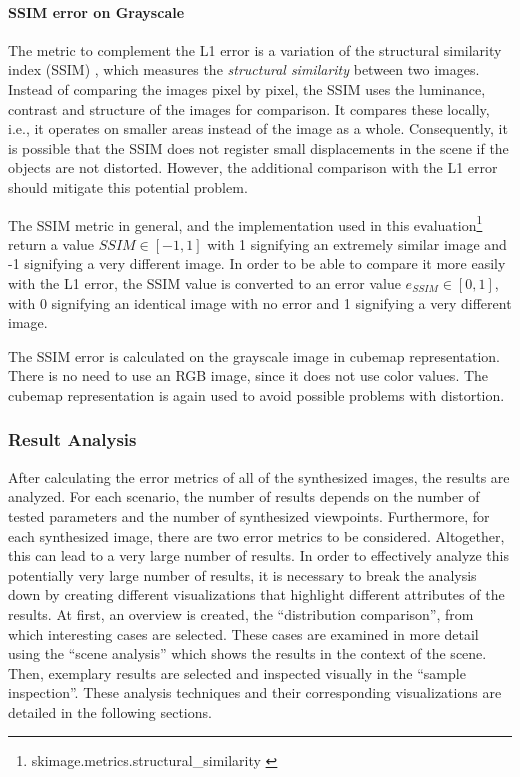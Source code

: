 \paragraph{SSIM error on Grayscale}
The metric to complement the L1 error is a variation of the structural similarity index (SSIM) \cite{ssim}, which measures the \emph{structural similarity} between two images. Instead of comparing the images pixel by pixel, the SSIM uses the luminance, contrast and structure of the images for comparison. It compares these locally, i.e., it operates on smaller areas instead of the image as a whole. Consequently, it is possible that the SSIM does not register small displacements in the scene if the objects are not distorted. However, the additional comparison with the L1 error should mitigate this potential problem.

The SSIM metric in general, and the implementation used in this evaluation\footnote{skimage.metrics.structural\_similarity \cite{skimage}} return a value $SSIM \in [-1, 1]$ with 1 signifying an extremely similar image and -1 signifying a very different image. In order to be able to compare it more easily with the L1 error, the SSIM value is converted to an error value $ e_{SSIM} \in [0,1]$, with 0 signifying an identical image with no error and 1 signifying a very different image.

The SSIM error is calculated on the grayscale image in cubemap representation. There is no need to use an RGB image, since it does not use color values. The cubemap representation is again used to avoid possible problems with distortion.

\subsubsection{Result Analysis}
After calculating the error metrics of all of the synthesized images, the results are analyzed.
For each scenario, the number of results depends on the number of tested parameters and the number of synthesized viewpoints. Furthermore, for each synthesized image, there are two error metrics to be considered. Altogether, this can lead to a very large number of results.
In order to effectively analyze this potentially very large number of results, it is necessary to break the analysis down by creating different visualizations that highlight different attributes of the results. At first, an overview is created, the ``distribution comparison'', from which interesting cases are selected. These cases are examined in more detail using the ``scene analysis'' which shows the results in the context of the scene. Then, exemplary results are selected and inspected visually in the ``sample inspection''. These analysis techniques and their corresponding visualizations are detailed in the following sections.

